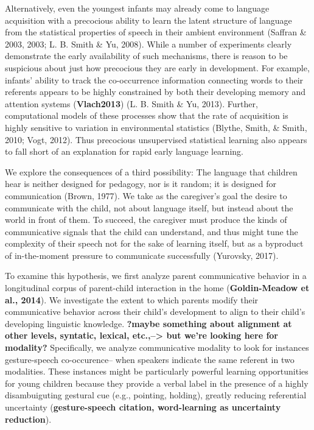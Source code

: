\documentclass[10pt, letterpaper]{article}
\begin{document}
Alternatively, even the youngest infants may already come to language
acquisition with a precocious ability to learn the latent structure of
language from the statistical properties of speech in their ambient
environment (Saffran \& 2003, 2003; L. B. Smith \& Yu, 2008). While a
number of experiments clearly demonstrate the early availability of such
mechanisms, there is reason to be suspicious about just how precocious
they are early in development. For example, infants' ability to track
the co-occurrence information connecting words to their referents
appears to be highly constrained by both their developing memory and
attention systems (\textbf{Vlach2013}) (L. B. Smith \& Yu, 2013).
Further, computational models of these processes show that the rate of
acquisition is highly sensitive to variation in environmental statistics
(Blythe, Smith, \& Smith, 2010; Vogt, 2012). Thus precocious
unsupervised statistical learning also appears to fall short of an
explanation for rapid early language learning.

We explore the consequences of a third possibility: The language that
children hear is neither designed for pedagogy, nor is it random; it is
designed for communication (Brown, 1977). We take as the caregiver's
goal the desire to communicate with the child, not about language
itself, but instead about the world in front of them. To succeed, the
caregiver must produce the kinds of communicative signals that the child
can understand, and thus might tune the complexity of their speech not
for the sake of learning itself, but as a byproduct of in-the-moment
pressure to communicate successfully (Yurovsky, 2017).

To examine this hypothesis, we first analyze parent communicative
behavior in a longitudinal corpus of parent-child interaction in the
home (\textbf{Goldin-Meadow et al., 2014}). We investigate the extent to
which parents modify their communicative behavior across their child's
development to align to their child's developing linguistic knowledge.
\textbf{?maybe something about alignment at other levels, syntatic,
lexical, etc.,--\textgreater{} but we're looking here for modality?}
Specifically, we analyze communicative modality to look for instances
gesture-speech co-occurence-- when speakers indicate the same referent
in two modalities. These instances might be particularly powerful
learning opportunities for young children because they provide a verbal
label in the presence of a highly disambuiguting gestural cue (e.g.,
pointing, holding), greatly reducing referential uncertainty
(\textbf{gesture-speech citation, word-learning as uncertainty
reduction}).
\end{document}
